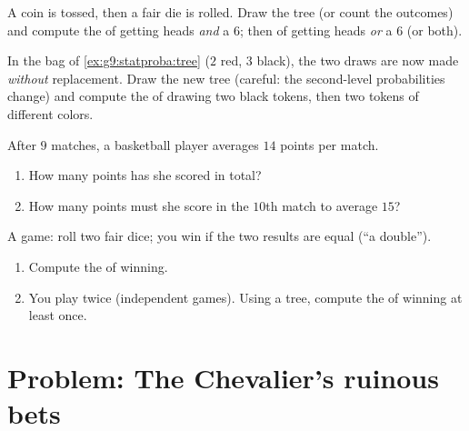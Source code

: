 \begin{exercise}[$\star\star$]\label{exo:g9:statproba:6}
A coin is tossed, then a fair die is rolled. Draw the tree (or count the
outcomes) and compute the  of getting heads \emph{and} a
$6$; then of getting heads \emph{or} a $6$ (or both).
\end{exercise}

\begin{exercise}[$\star\star$]\label{exo:g9:statproba:7}
In the bag of \cref{ex:g9:statproba:tree} ($2$ red, $3$ black), the two
draws are now made \emph{without} replacement. Draw the new tree
(careful: the second-level probabilities change) and compute the
 of drawing two black tokens, then two tokens of different
colors.
\end{exercise}

\begin{exercise}[$\star\star$]\label{exo:g9:statproba:8}
After $9$ matches, a basketball player averages $14$ points per match.
\begin{enumerate}
  \item How many points has she scored in total?
  \item How many points must she score in the $10$th match to average
        $15$?
\end{enumerate}
\end{exercise}

\begin{exercise}[$\star\star\star$]\label{exo:g9:statproba:9}
A game: roll two fair dice; you win if the two results are equal
(``a double'').
\begin{enumerate}
  \item Compute the  of winning.
  \item You play twice (independent games). Using a tree, compute the
         of winning at least once.
\end{enumerate}
\end{exercise}

\section{Problem: The Chevalier's ruinous bets}

